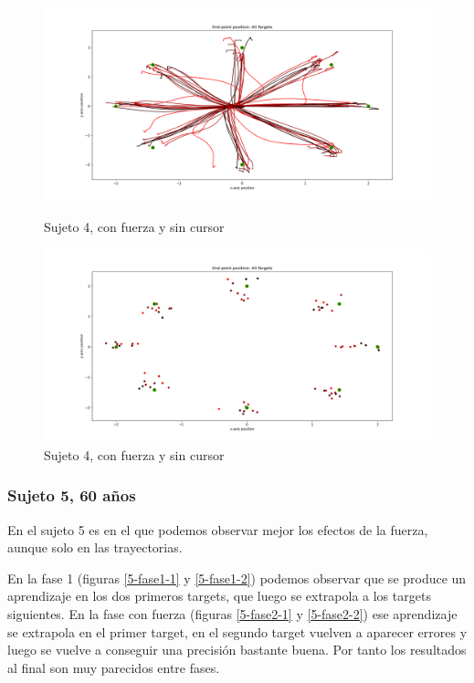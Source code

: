 \documentclass[a4paper,11pt, oneside]{book}
\begin{document}
\begin{figure}[H]
	\begin{minipage}[b]{0.5\linewidth}
		\centering
		\includegraphics[width=\linewidth]{sujeto4/force_no_cursor/trayectorias}
		\caption{Sujeto 4, con fuerza y sin cursor}
		\label{4-fase4-1}
	\end{minipage}
	\hspace{0.5cm}
	\begin{minipage}[b]{0.5\linewidth}
		\centering
		\includegraphics[width=\linewidth]{sujeto4/force_no_cursor/trayectorias_puntos}
		\caption{Sujeto 4, con fuerza y sin cursor}
		\label{4-fase4-2}
	\end{minipage}
\end{figure}



\subsubsection{Sujeto 5, 60 años}

En el sujeto 5 es en el que podemos observar mejor los efectos de la fuerza, aunque solo en las trayectorias.

En la fase 1 (figuras \ref{5-fase1-1} y \ref{5-fase1-2}) podemos observar que se produce un aprendizaje en los dos primeros targets, que luego se extrapola a los targets siguientes. En la fase con fuerza (figuras \ref{5-fase2-1} y \ref{5-fase2-2}) ese aprendizaje se extrapola en el primer target, en el segundo target vuelven a aparecer errores y luego se vuelve a conseguir una precisión bastante buena. Por tanto los resultados al final son muy parecidos entre fases. 
\end{document}
